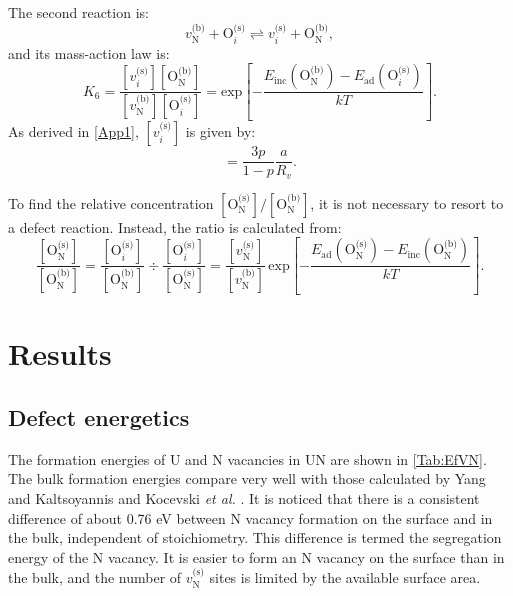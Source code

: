 \documentclass[preprint,12pt,sort&compress]{elsarticle}
\newcommand{\?}{\stackrel{?}{=}}
\begin{document}
The second reaction is:
\begin{equation}
v_\text{N}^\text{(b)} + \text{O}_i^\text{(s)}  \rightleftharpoons v_i^\text{(s)} + \text{O}_\text{N}^\text{(b)},
\end{equation}
and its mass-action law is:
\begin{equation}
K_6 = \frac{ [ v_i^\text{(s)} ]  [ \text{O}_\text{N}^\text{(b)} ] } { [ v_\text{N}^\text{(b)} ] [ \text{O}_i^\text{(s)} ] } = \text{exp}\! \left[ - \frac{ E_\text{inc}( \text{O}_\text{N}^\text{(b)} ) - E_\text{ad}( \text{O}_i^\text{(s)} ) } { k T } \right].
\end{equation}
As derived in \ref{App1}, $[ v_i^\text{(s)} ]$ is given by:
\begin{equation}
[ v_i^\text{(s)} ] = \frac{3p}{1-p} \frac{a}{R_v}.
\label{Eq:v_i^s}
\end{equation}

To find the relative concentration $[ \text{O}_\text{N}^\text{(s)} ] / [ \text{O}_\text{N}^\text{(b)} ]$, it is not necessary to resort to a defect reaction. Instead, the ratio is calculated from: 
\begin{equation}
\frac{ [ \text{O}_\text{N}^\text{(s)} ] }{ [ \text{O}_\text{N}^\text{(b)} ] } = \frac{ [ \text{O}_i^\text{(s)} ] }{ [ \text{O}_\text{N}^\text{(b)} ] } \div \frac{ [ \text{O}_i^\text{(s)} ] }{ [ \text{O}_\text{N}^\text{(s)} ] } = \frac{ [v_\text{N}^\text{(s)}] }{ [v_\text{N}^\text{(b)}] } \, \text{exp}\! \left[ - \frac{ E_\text{ad}( \text{O}_\text{N}^\text{(s)} ) - E_\text{inc}( \text{O}_\text{N}^\text{(b)} ) } { k T } \right].
\label{Eq:ONs_ONb}
\end{equation}

\section{Results}
\label{Sec:Results}

\subsection{Defect energetics}
\label{Sec:DefE}

The formation energies of U and N vacancies in UN are shown in \cref{Tab:EfVN}. The bulk formation energies compare very well with those calculated by Yang and Kaltsoyannis \cite{Yang2021} and Kocevski \textit{et al.} \cite{Kocevski2022I}. It is noticed that there is a consistent difference of about 0.76 eV between N vacancy formation on the surface and in the bulk, independent of stoichiometry. This difference is termed the segregation energy of the N vacancy. It is easier to form an N vacancy on the surface than in the bulk, and the number of $v_\text{N}^\text{(s)}$ sites is limited by the available surface area.
\end{document}
